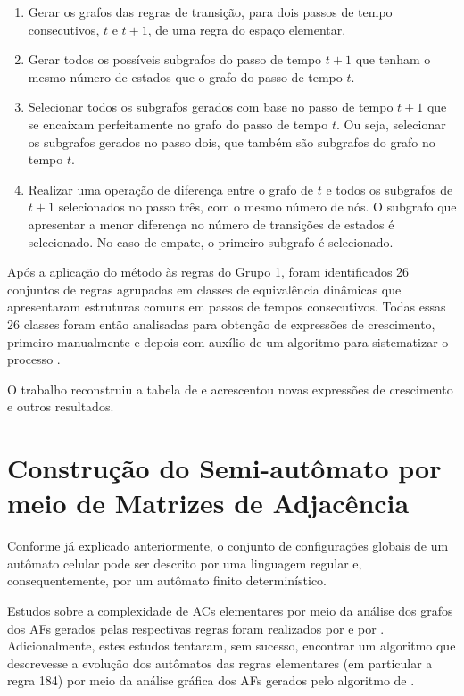 \documentclass[12pt,a4paper]{article}
\begin{document}
\begin{enumerate}\label{sec:mikialgo}
\item Gerar os grafos das regras de transição, para dois passos de tempo
consecutivos, $t$ e $t+1$, de uma regra do espaço elementar.

\item Gerar todos os possíveis subgrafos do passo de tempo $t+1$ que tenham
o mesmo número de estados que o grafo do passo de tempo $t$.

\item Selecionar todos os subgrafos gerados com base no passo de tempo $t+1$
que se encaixam perfeitamente no grafo do passo de tempo $t$. Ou seja,
selecionar os subgrafos gerados no passo dois, que também são subgrafos do
grafo no tempo $t$.

\item Realizar uma operação de diferença entre o grafo de $t$ e todos os
subgrafos de $t+1$ selecionados no passo três, com o mesmo número de nós. O
subgrafo que apresentar a menor diferença no número de transições de estados
é selecionado. No caso de empate, o primeiro subgrafo é selecionado.
\end{enumerate}

Após a aplicação do método às regras do Grupo 1, foram identificados 26
conjuntos de regras agrupadas em classes de equivalência dinâmicas que
apresentaram estruturas comuns em passos de tempos consecutivos. Todas essas
26 classes foram então analisadas para obtenção de expressões
de crescimento, primeiro manualmente e depois com auxílio de um algoritmo
para sistematizar o processo .

O trabalho reconstruiu a tabela de  e acrescentou novas
expressões de crescimento e outros resultados.

\newpage

\section{Construção do Semi-autômato por meio de Matrizes de
Adjacência}\label{sec:desenv}

Conforme já explicado anteriormente, o conjunto de configurações globais de
um autômato celular pode ser descrito por uma linguagem regular e,
consequentemente, por um autômato finito determinístico.

Estudos sobre a complexidade de ACs elementares por meio da
análise dos grafos dos AFs gerados pelas respectivas regras
foram realizados por  e por .
Adicionalmente, estes estudos tentaram, sem sucesso, encontrar um algoritmo
que descrevesse a evolução dos autômatos das regras elementares (em
particular a regra 184) por meio da análise gráfica dos AFs
gerados pelo algoritmo de .
\end{document}

